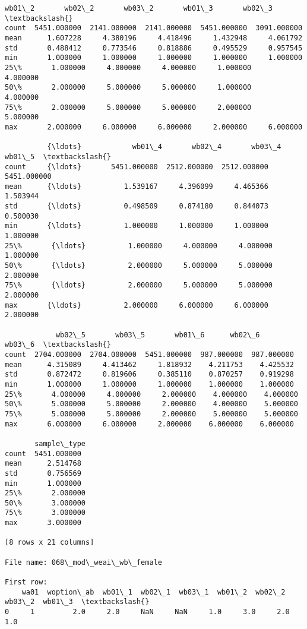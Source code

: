 \documentclass[11pt]{article}
\begin{document}
\begin{Verbatim}[commandchars=\\\{\}]
            wb01\_2       wb02\_2       wb03\_2       wb01\_3       wb02\_3  \textbackslash{}
count  5451.000000  2141.000000  2141.000000  5451.000000  3091.000000   
mean      1.607228     4.380196     4.418496     1.432948     4.061792   
std       0.488412     0.773546     0.818886     0.495529     0.957545   
min       1.000000     1.000000     1.000000     1.000000     1.000000   
25\%       1.000000     4.000000     4.000000     1.000000     4.000000   
50\%       2.000000     5.000000     5.000000     1.000000     4.000000   
75\%       2.000000     5.000000     5.000000     2.000000     5.000000   
max       2.000000     6.000000     6.000000     2.000000     6.000000   

          {\ldots}            wb01\_4       wb02\_4       wb03\_4       wb01\_5  \textbackslash{}
count     {\ldots}       5451.000000  2512.000000  2512.000000  5451.000000   
mean      {\ldots}          1.539167     4.396099     4.465366     1.503944   
std       {\ldots}          0.498509     0.874180     0.844073     0.500030   
min       {\ldots}          1.000000     1.000000     1.000000     1.000000   
25\%       {\ldots}          1.000000     4.000000     4.000000     1.000000   
50\%       {\ldots}          2.000000     5.000000     5.000000     2.000000   
75\%       {\ldots}          2.000000     5.000000     5.000000     2.000000   
max       {\ldots}          2.000000     6.000000     6.000000     2.000000   

            wb02\_5       wb03\_5       wb01\_6      wb02\_6      wb03\_6  \textbackslash{}
count  2704.000000  2704.000000  5451.000000  987.000000  987.000000   
mean      4.315089     4.413462     1.818932    4.211753    4.425532   
std       0.872472     0.819606     0.385110    0.870257    0.919298   
min       1.000000     1.000000     1.000000    1.000000    1.000000   
25\%       4.000000     4.000000     2.000000    4.000000    4.000000   
50\%       5.000000     5.000000     2.000000    4.000000    5.000000   
75\%       5.000000     5.000000     2.000000    5.000000    5.000000   
max       6.000000     6.000000     2.000000    6.000000    6.000000   

       sample\_type  
count  5451.000000  
mean      2.514768  
std       0.756569  
min       1.000000  
25\%       2.000000  
50\%       3.000000  
75\%       3.000000  
max       3.000000  

[8 rows x 21 columns]

File name: 068\_mod\_weai\_wb\_female

First row: 
    wa01  woption\_ab  wb01\_1  wb02\_1  wb03\_1  wb01\_2  wb02\_2  wb03\_2  wb01\_3  \textbackslash{}
0     1         2.0     2.0     NaN     NaN     1.0     3.0     2.0     1.0   


\end{Verbatim}
\end{document}
